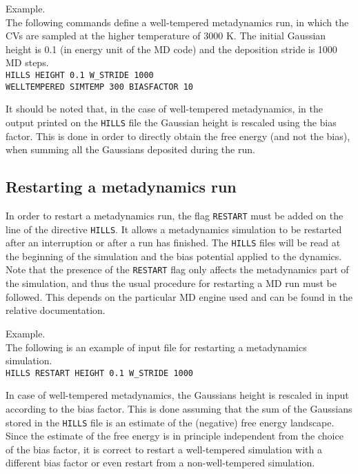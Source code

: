 \documentclass[12pt,fleqn]{report}
\newcommand{\keyword}[1]{\index{Keywords!{\tt #1}} {\tt #1}}
\newcommand{\esempio}[1]{
\vspace{10pt}
\begin{flushright}
\colorbox{light-gray}{
   \begin{minipage}{13cm}
       \scriptsize{
{\fontfamily{phv} \fontseries{b}
 \selectfont Example. \\
 \fontseries{m} \selectfont #1 } }
\end{minipage}}
\end{flushright}
\vspace{20pt}
}
\begin{document}
\esempio{
The following commands define a well-tempered metadynamics run, in which the CVs are sampled 
at the higher temperature of 3000 K. The initial Gaussian height is 0.1 (in energy unit of the MD code) and the
deposition stride is 1000 MD steps.
\vspace{10pt} \\ 
 {\tt HILLS  HEIGHT 0.1 W\_STRIDE 1000  \\
 WELLTEMPERED SIMTEMP 300 BIASFACTOR 10} }

It should be noted that, in the case of well-tempered metadynamics,
in the output printed on the {\tt HILLS} file
the Gaussian height is rescaled using the bias factor.
This is done in order to directly obtain the free energy (and not the bias), 
when summing all the Gaussians deposited during the run.


%
\subsection{Restarting a metadynamics run}

In order to restart a metadynamics run, the flag {\tt RESTART} must be added on the line of the directive {\tt HILLS}. 
It allows a metadynamics simulation to be restarted after
an interruption or after a run has finished. The {\tt HILLS} files will be read
at the beginning of the simulation and the bias potential applied to the
dynamics. Note that the presence of the {\tt RESTART} flag only affects
the metadynamics part of the simulation, and thus the usual procedure for 
restarting a MD run must be followed. This depends on the
particular MD engine used and can be found in the relative documentation.
\esempio{The following is an example of input file for restarting a metadynamics simulation.  \vspace{10pt} \\ 
{ \tt HILLS RESTART HEIGHT 0.1 W\_STRIDE 1000 }}

In case of well-tempered metadynamics, the Gaussians height is rescaled in input according to the
bias factor. This is done assuming that the sum of the Gaussians stored in the {\tt HILLS} file
is an estimate of the (negative) free energy landscape. Since the estimate of the free energy
is in principle independent from the choice of the bias factor, it is correct to restart a
well-tempered simulation with a different bias factor or even restart from a non-well-tempered simulation.

\end{document}

